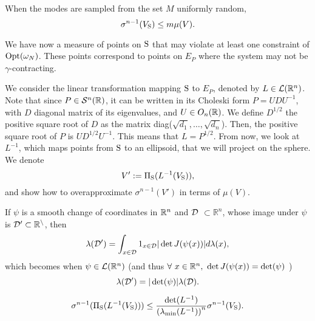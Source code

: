 \begin{corollary} \label{cor:measure}When the modes are sampled from the set $M$ uniformly random, 
\begin{equation*}\sigma^{n-1}(V_{\text{S}}) \leq m \mu(V). \end{equation*}
\end{corollary}

We have now a measure of points on $\text{S}$ that may violate at least one constraint of $\text{Opt}(\omega_N)$. These points correspond to points on $E_P$ where the system may not be $\gamma$-contracting.

We consider the linear transformation mapping $\text{S}$ to $E_P$, denoted by $L \in \mathcal{L}(\mathbb{R}^n)$. Note that since $P \in \mathcal{S}^n(\mathbb{R})$, it can be written in its Choleski form $P = U D U^{-1}$, with $D$ diagonal matrix of its eigenvalues, and $U \in O_n(\mathbb{R})$. We define $D^{1/2}$ the positive square root of $D$ as the matrix diag($\sqrt{d_1},\dots, \sqrt{d_n}$). Then, the positive square root of $P$ is $U D^{1/2} U^{-1}$. This means that $L = P^{1/2}$. 
From now, we look at $L^{-1}$, which maps points from $\text{S}$ to an ellipsoid, that we will project on the sphere. We denote $$V':=\Pi_{\text{S}}(L^{-1}(V_{\text{S}})),$$ and show how to overapproximate $\sigma^{n-1}(V')$ in terms of $\mu(V)$.

\begin{remark} \label{rem:mappingMeasures}
If $\psi$ is a smooth change of coordinates in $\mathbb{R}^n$ and $\cal{D}$ $\subset \mathbb{R}^n$, whose image under $\psi$ is $\cal{D}' \subset \R^n$, then
\begin{equation}
\lambda(\mathcal{D}') = \int_{x \in \mathcal{D}} 1_{x \in \mathcal{D}} |\det J(\psi(x))| d\lambda(x),
\end{equation}
which becomes when $\psi \in \mathcal{L}(\mathbb{R}^n)$ (and thus $\forall\ x \in \mathbb{R}^n, \ \det J(\psi(x)) = \det(\psi)$ )
\begin{equation}
\lambda(\mathcal{D}') = |\det(\psi)| \lambda(\mathcal{D}).
\end{equation}
\end{remark}

\begin{theorem} \label{lemma:lip}
\begin{equation}
\sigma^{n-1}(\Pi_{\text{S}}(L^{-1}(V_{\text{S}}))) \leq \frac{\det(L^{-1})}{\left(\lambda_{\min}(L^{-1})\right)^n} \sigma^{n-1}(V_{\text{S}}).
\end{equation}   
\end{theorem}

